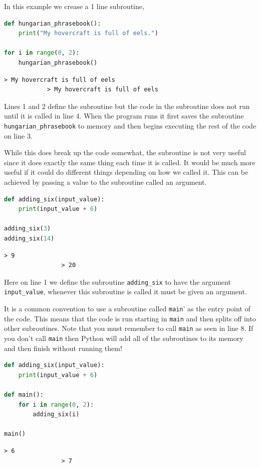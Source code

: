 In this example we crease a 1 line subroutine,

\begin{minipage}{\paperwidth}
			\begin{lstlisting}[language=Python]
def hungarian_phrasebook():
	print("My hovercraft is full of eels.")

for i in range(0, 2):
	hungarian_phrasebook()\end{lstlisting}
			\begin{verbatim}> My hovercraft is full of eels
			> My hovercraft is full of eels
			\end{verbatim}
\end{minipage}

Lines 1 and 2 define the subroutine but the code in the subroutine does not run until it is called in line 4. When the program runs it first saves the subroutine \texttt{hungarian\_phrasebook} to memory and then begins executing the rest of the code on line 3. 

While this does break up the code somewhat, the subroutine is not very useful since it does exactly the same thing each time it is called. It would be much more useful if it could do different things depending on how we called it. This can be achieved by passing a value to the subroutine called an argument.

			\begin{lstlisting}[language=Python]
def adding_six(input_value):
	print(input_value + 6)

adding_six(3)
adding_six(14)\end{lstlisting}
			\begin{verbatim}> 9
				> 20\end{verbatim}

				Here on line 1 we define the subroutine \texttt{adding\_six} to have the argument \texttt{input\_value}, whenever this subroutine is called it must be given an argument. 

It is a common convention to use a subroutine called \texttt{main}' as the entry point of the code. This means that the code is run starting in \texttt{main} and then splits off into other subroutines. Note that you must remember to call \texttt{main} as seen in line 8. If you don't call \texttt{main} then Python will add all of the subroutines to its memory and then finish without running them!
				
			\begin{lstlisting}[language=Python]
def adding_six(input_value):
	print(input_value + 6)

def main():
	for i in range(0, 2):
		adding_six(i)
		
main()\end{lstlisting}
			\begin{verbatim}> 6
				> 7\end{verbatim}
				
